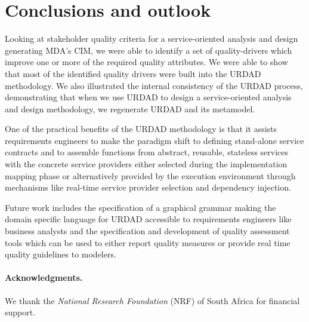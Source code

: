 \section{Conclusions and outlook}

Looking at stakeholder quality criteria for a service-oriented analysis and design generating MDA's CIM, we were able to identify a set of quality-drivers which improve one or more of the required quality attributes. We were able to show that most of the identified quality drivers were built into the URDAD methodology. We also illustrated the internal consistency of the URDAD process, demonstrating that when we use URDAD to design a service-oriented analysis and design methodology, we regenerate URDAD and its metamodel.

One of the practical benefits of the URDAD methodology is that it assists requirements engineers to make the paradigm shift\cite{haines_impact_2007} to defining stand-alone service contracts and to assemble functions from abstract, reusable, stateless services with the concrete service providers either selected during the implementation mapping phase or alternatively provided by the execution environment through mechanisms like real-time service provider selection and dependency injection.

Future work includes the specification of a graphical grammar making the domain specific language for URDAD accessible to requirements engineers like business analysts and the specification and development of quality assessment tools which can be used to either report quality measures or provide real time quality guidelines to modelers.

\paragraph{Acknowledgments.} We thank the \emph{National Research 
Foundation} (NRF) of South Africa for financial support.
